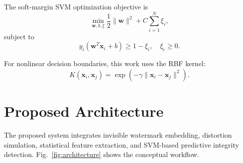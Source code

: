 \documentclass[conference]{IEEEtran}
\begin{document}
The soft-margin SVM optimization objective is
\begin{equation}
\min_{\mathbf{w},b,\xi} \frac{1}{2}\lVert \mathbf{w} \rVert^2 + C\sum_{i=1}^{N}\xi_i,
\label{eq:svm_objective}
\end{equation}
subject to
\begin{equation}
y_i(\mathbf{w}^{T}\mathbf{x}_i+b) \geq 1-\xi_i,\quad \xi_i \geq 0.
\end{equation}

For nonlinear decision boundaries, this work uses the RBF kernel:
\begin{equation}
K(\mathbf{x}_i,\mathbf{x}_j) = \exp(-\gamma \lVert \mathbf{x}_i-\mathbf{x}_j \rVert^2).
\label{eq:rbf}
\end{equation}

\section{Proposed Architecture}
The proposed system integrates invisible watermark embedding, distortion simulation, statistical feature extraction, and SVM-based predictive integrity detection. Fig.~\ref{fig:architecture} shows the conceptual workflow.
\end{document}
